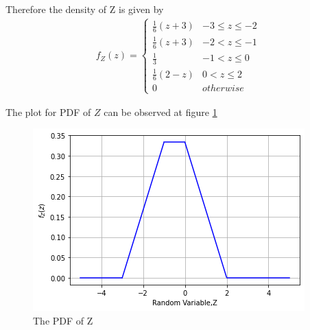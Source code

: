 \documentclass[journal,12pt,twocolumn]{IEEEtran}
\begin{document}
Therefore the density of Z is given by
\begin{align}
\label{eq:pdf_z}
f_{Z}(z)  = 
\begin{cases}
\frac{1}{6}(z+3) & -3 \le z \le -2
\\
\frac{1}{6}(z+3) & -2 < z \le -1
\\
\frac{1}{3} & -1 < z \le 0
\\
\frac{1}{6}(2-z) & 0 < z \le 2
\\
0 & otherwise
\end{cases}
\end{align}

The plot for PDF of $Z $ can be observed at figure \ref{fig:The PDF of Z}\\

\begin{figure}[!ht]
       \centering
    \includegraphics[width=.9\columnwidth] {Assignment_4_Fig_1.png}
    \caption{The PDF of Z}
    \label{fig:The PDF of Z}
\end{figure}
\end{document}
